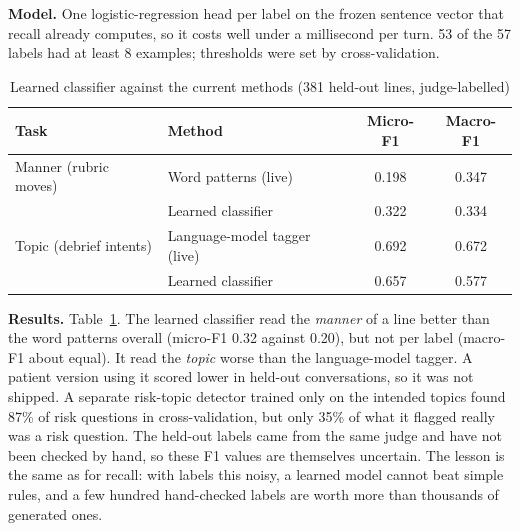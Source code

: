 \documentclass[10pt]{article}
\begin{document}
\textbf{Model.} One logistic-regression head per label on the frozen sentence vector that recall already computes, so it costs well under a
millisecond per turn. 53 of the 57 labels had at least 8 examples; thresholds were set by cross-validation.

\begin{table}[htbp]
\caption{Learned classifier against the current methods (381 held-out lines, judge-labelled)}
\label{p3:tab:clf}
\centering
\footnotesize
\begin{tabular}{@{}llcc@{}}
\toprule
Task & Method & Micro-F1 & Macro-F1\\
\midrule
Manner (rubric moves) & Word patterns (live) & 0.198 & 0.347\\
& Learned classifier & 0.322 & 0.334\\
\midrule
Topic (debrief intents) & Language-model tagger (live) & 0.692 & 0.672\\
& Learned classifier & 0.657 & 0.577\\
\bottomrule
\end{tabular}
\end{table}

\textbf{Results.} Table~\ref{p3:tab:clf}. The learned classifier read the \emph{manner} of a line better than the word patterns overall (micro-F1 0.32 against 0.20), but not per label (macro-F1 about equal). It read the \emph{topic} worse than the language-model tagger. A patient
version using it scored lower in held-out conversations, so it was not shipped. A separate risk-topic detector trained only on the intended topics
found 87\% of risk questions in cross-validation, but only 35\% of what it flagged really was a risk question. The held-out labels came from the
same judge and have not been checked by hand, so these F1 values are themselves uncertain. The lesson is the same as for recall: with labels this
noisy, a learned model cannot beat simple rules, and a few hundred hand-checked labels are worth more than thousands of generated ones.





\end{document}
